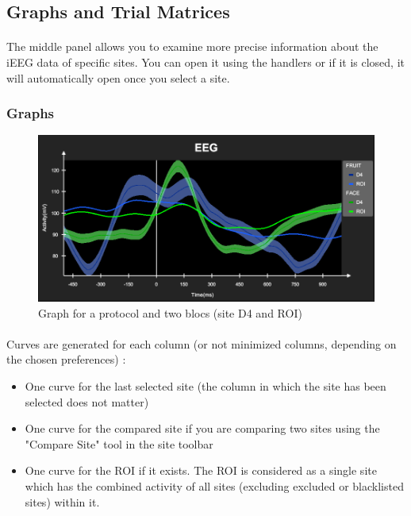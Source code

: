 \documentclass[a4paper]{article}
\begin{document}
\subsection{Graphs and Trial Matrices}\label{graphs}
\paragraph{} The middle panel allows you to examine more precise information about the iEEG data of specific sites. You can open it using the handlers or if it is closed, it will automatically open once you select a site.
\subsubsection{Graphs}
\begin{figure}[H]
\begin{center}
\includegraphics[scale=0.35]{Graph.png}
\end{center}
\caption{\label{graph}Graph for a protocol and two blocs (site D4 and ROI)}
\end{figure}
\paragraph{} Curves are generated for each column (or not minimized columns, depending on the chosen preferences) :
\begin{itemize}
\item One curve for the last selected site (the column in which the site has been selected does not matter)
\item One curve for the compared site if you are comparing two sites using the "Compare Site" tool in the site toolbar
\item One curve for the ROI if it exists. The ROI is considered as a single site which has the combined activity of all sites (excluding excluded or blacklisted sites) within it.
\end{itemize}
\end{document}
